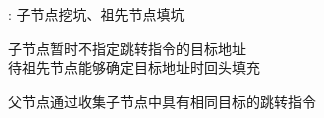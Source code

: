 
\begin{frame}{}
  \begin{center}
    : {子节点挖坑、祖先节点填坑}


    \pause
    子节点暂时不指定跳转指令的目标地址 \\[5pt]
    待祖先节点能够确定目标地址时回头填充

    \pause
    \vspace{0.80cm}
    父节点通过收集子节点中具有相同目标的跳转指令
  \end{center}
\end{frame}

\begin{frame}{}
\end{frame}

